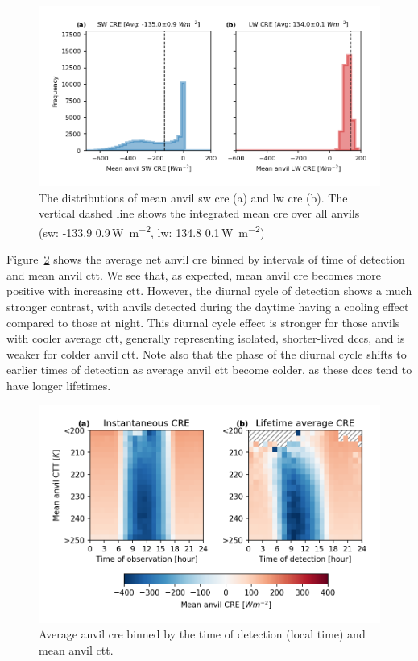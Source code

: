 \documentclass[acp, manuscript]{copernicus}
\begin{document}
\begin{figure}[tp]
    \includegraphics[width=12cm]{figures/fig12.png}
    \caption[
    The distributions of mean anvil \acrshort{sw} \acrshort{cre} and \acrshort{lw} \acrshort{cre}
    ]{
    The distributions of mean anvil \acrshort{sw} \acrshort{cre} (a) and \acrshort{lw} \acrshort{cre} (b). The vertical dashed line shows the integrated mean \acrshort{cre} over all anvils (\acrshort{sw}: -133.9\,\textpm\,0.9\,\unit{W m^{-2}}, \acrshort{lw}: 134.8\,\textpm\,0.1\,\unit{W m^{-2}})
    }
    \label{fig:anvil_sw_lw_cre}
\end{figure}


Figure~\ref{fig:anvil_cre_time_vs_ctt} shows the average net anvil \acrshort{cre} binned by intervals of time of detection and mean anvil \acrshort{ctt}. 
We see that, as expected, mean anvil \acrshort{cre} becomes more positive with increasing \acrshort{ctt}. 
However, the diurnal cycle of detection shows a much stronger contrast, with anvils detected during the daytime having a cooling effect compared to those at night. 
This diurnal cycle effect is stronger for those anvils with cooler average \acrshort{ctt}, generally representing isolated, shorter-lived \acrshort{dcc}s, and is weaker for colder anvil \acrshort{ctt}. 
Note also that the phase of the diurnal cycle shifts to earlier times of detection as average anvil \acrshort{ctt} become colder, as these \acrshort{dcc}s tend to have longer lifetimes.


\begin{figure}[tp]
    \includegraphics[width=12cm]{figures/fig13.png}
    \caption[
    Average anvil \acrshort{cre} binned by the time of detection (local time) and mean anvil \acrshort{ctt}
    ]{
    Average anvil \acrshort{cre} binned by the time of detection (local time) and mean anvil \acrshort{ctt}.
    }
    \label{fig:anvil_cre_time_vs_ctt}
\end{figure}
\end{document}
